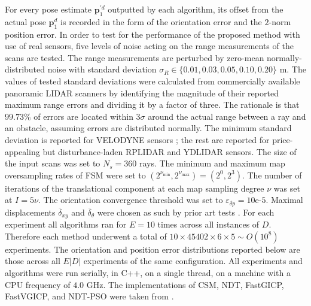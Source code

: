 For every pose estimate $\bm{p}_1^{\prime d}$ outputted by each algorithm, its
offset from the actual pose $\bm{p}_1^d$ is recorded in the form of the
orientation error and the $2$-norm position error.
In order to test for the performance of the proposed method with use of real
sensors, five levels of noise acting on the range measurements of the scans are
tested. The range measurements are perturbed by zero-mean normally-distributed
noise with standard deviation $\sigma_R \in \{0.01, 0.03, 0.05, 0.10, 0.20\}$ m.
The values of tested standard deviations were calculated from
commercially available panoramic LIDAR scanners by identifying the magnitude of
their reported maximum range errors and dividing it by a factor of three. The
rationale is that $99.73\%$ of errors are located within $3\sigma$ around the
actual range between a ray and an obstacle, assuming errors are distributed
normally. The minimum standard deviation is reported for
VELODYNE sensors \cite{velodyne_datasheet}; the rest are reported for
price-appealing but disturbance-laden RPLIDAR \cite{a2m8_datasheet} and YDLIDAR
\cite{ydlidar_datasheets} sensors. The size of the input scans was set
to $N_s=360$ rays. The minimum and maximum map oversampling rates of FSM were
set to $(2^{\nu_{\min}},2^{\nu_{\max}}) = (2^0,2^3)$.  The number of iterations
of the translational component at each map sampling degree $\nu$ was set at $I
= 5\nu$. The orientation convergence threshold was set to $\varepsilon_{\delta
p} = 10$e-$5$. Maximal displacements $\overline{\delta}_{xy}$ and
$\overline{\delta}_\theta$ were chosen as such by prior art tests \cite{plicp}.
For each experiment all algorithms ran for $E = 10$ times across all instances
of $D$. Therefore each method underwent a total of $10 \times 45402 \times 6
\times 5 \sim O(10^8)$ experiments.  The orientation and position error
distributions reported below are those across all $E |D|$ experiments of
the same configuration.  All experiments and algorithms were run serially, in
C++, on a single thread, on a machine with a CPU frequency of $4.0$ GHz. The
implementations of CSM, NDT, FastGICP, FastVGICP, and NDT-PSO were taken from
\cite{implementations}.
